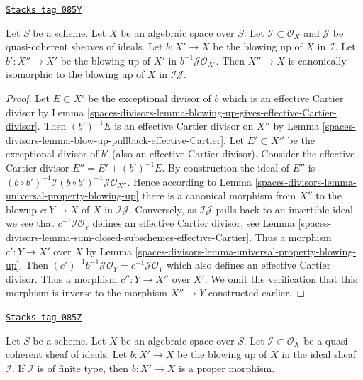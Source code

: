 \begin{lemma}
\label{spaces-divisors-lemma-blowing-up-two-ideals}
\href{https://stacks.math.columbia.edu/tag/085Y}{\texttt{Stacks tag 085Y}}

Let $S$ be a scheme. Let $X$ be an algebraic space over $S$.
Let $\mathcal{I} \subset \mathcal{O}_X$ and $\mathcal{J}$ be
quasi-coherent sheaves of ideals. Let $b : X' \to X$ be the blowing up
of $X$ in $\mathcal{I}$. Let $b' : X'' \to X'$ be the blowing up of
$X'$ in $b^{-1}\mathcal{J} \mathcal{O}_{X'}$. Then $X'' \to X$
is canonically isomorphic to the blowing up of $X$ in $\mathcal{I}\mathcal{J}$.
\end{lemma}

\begin{proof}
Let $E \subset X'$ be the exceptional divisor of $b$ which is an effective
Cartier divisor by
Lemma \ref{spaces-divisors-lemma-blowing-up-gives-effective-Cartier-divisor}.
Then $(b')^{-1}E$ is an effective Cartier divisor on $X''$ by
Lemma \ref{spaces-divisors-lemma-blow-up-pullback-effective-Cartier}.
Let $E' \subset X''$ be the exceptional divisor of $b'$ (also an effective
Cartier divisor). Consider the effective Cartier divisor
$E'' = E' + (b')^{-1}E$. By construction the ideal of $E''$ is
$(b \circ b')^{-1}\mathcal{I} (b \circ b')^{-1}\mathcal{J} \mathcal{O}_{X''}$.
Hence according to Lemma \ref{spaces-divisors-lemma-universal-property-blowing-up}
there is a canonical morphism from $X''$ to the blowup $c : Y \to X$
of $X$ in $\mathcal{I}\mathcal{J}$. Conversely, as $\mathcal{I}\mathcal{J}$
pulls back to an invertible ideal we see that
$c^{-1}\mathcal{I}\mathcal{O}_Y$ defines
an effective Cartier divisor, see
Lemma \ref{spaces-divisors-lemma-sum-closed-subschemes-effective-Cartier}.
Thus a morphism $c' : Y \to X'$ over $X$ by
Lemma \ref{spaces-divisors-lemma-universal-property-blowing-up}.
Then $(c')^{-1}b^{-1}\mathcal{J}\mathcal{O}_Y = c^{-1}\mathcal{J}\mathcal{O}_Y$
which also defines an effective Cartier divisor. Thus a morphism
$c'' : Y \to X''$ over $X'$. We omit the verification that this
morphism is inverse to the morphism $X'' \to Y$ constructed earlier.
\end{proof}

\begin{lemma}
\label{spaces-divisors-lemma-blowing-up-projective}
\href{https://stacks.math.columbia.edu/tag/085Z}{\texttt{Stacks tag 085Z}}

Let $S$ be a scheme. Let $X$ be an algebraic space over $S$.
Let $\mathcal{I} \subset \mathcal{O}_X$ be a quasi-coherent
sheaf of ideals. Let $b : X' \to X$ be the blowing up of $X$
in the ideal sheaf $\mathcal{I}$. If $\mathcal{I}$ is of finite type, then
$b : X' \to X$ is a proper morphism.
\end{lemma}

